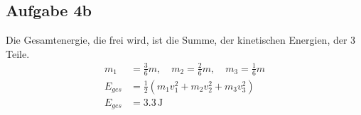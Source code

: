 \documentclass[a4paper,10pt]{extarticle}
\begin{document}
  \subsection*{Aufgabe 4b}
  Die Gesamtenergie, die frei wird, ist die Summe, der kinetischen Energien, der 3 Teile.
  \begin{align*}
  m_1 &= \frac{3}{6}m, \quad
  m_2 = \frac{2}{6}m, \quad
  m_3 = \frac{1}{6}m \\
  E_{ges} &= \frac{1}{2}(m_1 v_1^2 + m_2 v_2^2 + m_3 v_3^2) \\
  E_{ges} &= 3.3 \, \mbox{J} 
  \end{align*}
\end{document}
